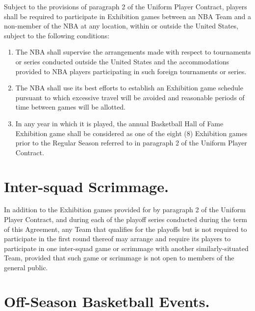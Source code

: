 \documentclass[
]{book}
\providecommand{\tightlist}{%
  \setlength{\itemsep}{0pt}\setlength{\parskip}{0pt}}
\begin{document}
Subject to the provisions of paragraph 2 of the Uniform Player Contract, players shall be required to participate in Exhibition games between an NBA Team and a non-member of the NBA at any location, within or outside the United States, subject to the following conditions:

\begin{enumerate}
\def\labelenumi{(\alph{enumi})}
\tightlist
\item
  The NBA shall supervise the arrangements made with respect to tournaments or series conducted outside the United States and the accommodations provided to NBA players participating in such foreign tournaments or series.
\item
  The NBA shall use its best efforts to establish an Exhibition game schedule pursuant to which excessive travel will be avoided and reasonable periods of time between games will be allotted.
\item
  In any year in which it is played, the annual Basketball Hall of Fame Exhibition game shall be considered as one of the eight (8) Exhibition games prior to the Regular Season referred to in paragraph 2 of the Uniform Player Contract.
\end{enumerate}

\hypertarget{inter-squad-scrimmage.}{%
\section{Inter-squad Scrimmage.}\label{inter-squad-scrimmage.}}

In addition to the Exhibition games provided for by paragraph 2 of the Uniform Player Contract, and during each of the playoff series conducted during the term of this Agreement, any Team that qualifies for the playoffs but is not required to participate in the first round thereof may arrange and require its players to participate in one inter-squad game or scrimmage with another similarly-situated Team, provided that such game or scrimmage is not open to members of the general public.

\hypertarget{off-season-basketball-events.}{%
\section{Off-Season Basketball Events.}\label{off-season-basketball-events.}}
\end{document}
